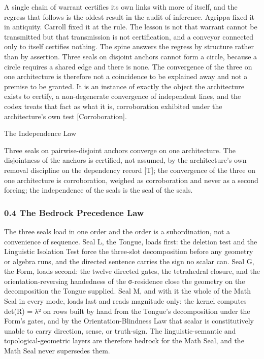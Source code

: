 \documentclass[10pt,twocolumn]{article}
\begin{document}
A single chain of warrant certifies its own links with more of itself,
and the regress that follows is the oldest result in the audit of
inference. Agrippa fixed it in antiquity. Carroll fixed it at the rule.
The lesson is not that warrant cannot be transmitted but that
transmission is not certification, and a conveyor connected only to
itself certifies nothing. The spine answers the regress by structure
rather than by assertion. Three seals on disjoint anchors cannot form a
circle, because a circle requires a shared edge and there is none. The
convergence of the three on one architecture is therefore not a
coincidence to be explained away and not a premise to be granted. It is
an instance of exactly the object the architecture exists to certify, a
non-degenerate convergence of independent lines, and the codex treats
that fact as what it is, corroboration exhibited under the
architecture's own test {[}Corroboration{]}.

\begin{jbox}{The Independence Law}

Three seals on pairwise-disjoint anchors converge on one architecture.
The disjointness of the anchors is certified, not assumed, by the
architecture's own removal discipline on the dependency record {[}T{]};
the convergence of the three on one architecture is corroboration,
weighed as corroboration and never as a second forcing; the independence
of the seals is the seal of the seals.

\end{jbox}

\hypertarget{the-bedrock-precedence-law}{%
\subsubsection{0.4 The Bedrock Precedence
Law}\label{the-bedrock-precedence-law}}

The three seals load in one order and the order is a subordination, not
a convenience of sequence. Seal L, the Tongue, loads first: the deletion
test and the Linguistic Isolation Test force the three-slot
decomposition before any geometry or algebra runs, and the directed
sentence carries the sign no scalar can. Seal G, the Form, loads second:
the twelve directed gates, the tetrahedral closure, and the
orientation-reversing handedness of the σ-residence close the geometry
on the decomposition the Tongue supplied. Seal M, and with it the whole
of the Math Seal in every mode, loads last and reads magnitude only: the
kernel computes det(R) = λ² on rows built by hand from the Tongue's
decomposition under the Form's gates, and by the Orientation-Blindness
Law that scalar is constitutively unable to carry direction, sense, or
truth-sign. The linguistic-semantic and topological-geometric layers are
therefore bedrock for the Math Seal, and the Math Seal never supersedes
them.
\end{document}

